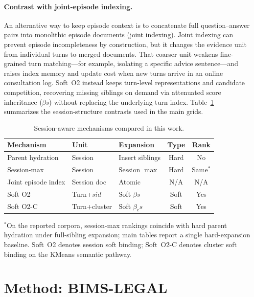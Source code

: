 \documentclass[preprint,12pt,authoryear]{elsarticle}
\newcommand{\compacttab}{\setlength{\tabcolsep}{4.5pt}\renewcommand{\arraystretch}{1.05}}
\begin{document}
\paragraph{Contrast with joint-episode indexing.}
An alternative way to keep episode context is to concatenate full question--answer pairs into monolithic episode documents (joint indexing).
Joint indexing can prevent episode incompleteness by construction, but it changes the evidence unit from individual turns to merged documents.
That coarser unit weakens fine-grained turn matching---for example, isolating a specific advice sentence---and raises index memory and update cost when new turns arrive in an online consultation log.
Soft~O2 instead keeps turn-level representations and candidate competition, recovering missing siblings on demand via attenuated score inheritance ($\beta s$) without replacing the underlying turn index.
Table~\ref{tab:rw_compare} summarizes the session-structure contrasts used in the main grids.

\begin{table}[htbp]
\centering
\caption{Session-aware mechanisms compared in this work.}
\label{tab:rw_compare}
\compacttab\footnotesize
\begin{tabular}{@{}llp{2.2cm}cc@{}}
\toprule
\textbf{Mechanism} & \textbf{Unit} & \textbf{Expansion} & \textbf{Type} & \textbf{Rank} \\
\midrule
Parent hydration & Session & Insert siblings & Hard & No \\
Session-max & Session & Session $\max$ & Hard & Same$^*$ \\
Joint episode index & Session doc & Atomic & N/A & N/A \\
Soft O2 & Turn+$sid$ & Soft $\beta s$ & Soft & Yes \\
Soft O2-C & Turn+cluster & Soft $\beta_c s$ & Soft & Yes \\
\bottomrule
\end{tabular}
\end{table}
{\footnotesize $^*$On the reported corpora, session-max rankings coincide with hard parent hydration under full-sibling expansion; main tables report a single hard-expansion baseline. Soft~O2 denotes session soft binding; Soft~O2-C denotes cluster soft binding on the KMeans semantic pathway.}

\section{Method: BIMS-LEGAL}\label{sec:method}
\end{document}
